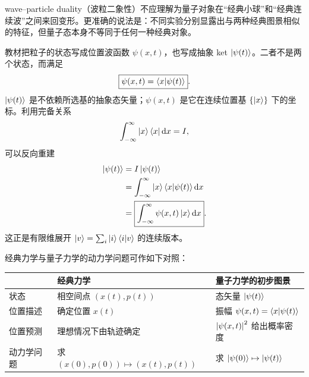 wave--particle duality（波粒二象性）不应理解为量子对象在“经典小球”和“经典连续波”之间来回变形。更准确的说法是：不同实验分别显露出与两种经典图景相似的特征，但量子态本身不等同于任何一种经典对象。



教材把粒子的状态写成位置波函数 $\psi(x,t)$，也写成抽象 ket $\left|\psi(t)\right\rangle$。二者不是两个状态，而满足
\begin{equation}
  \boxed{\psi(x,t)=\left\langle x \middle| \psi(t) \right\rangle}.
  \label{eq:QM-C03-S05-position-component}
\end{equation}
$\left|\psi(t)\right\rangle$ 是不依赖所选基的抽象态矢量；$\psi(x,t)$ 是它在连续位置基 $\{\left|x\right\rangle\}$ 下的坐标。利用完备关系
\begin{equation}
  \int_{-\infty}^{\infty}\left|x\right\rangle\left\langle x\right|\mathop{}\!\mathrm{d} x=I,
  \label{eq:QM-C03-S05-position-completeness}
\end{equation}
可以反向重建
\begin{align}
  \left|\psi(t)\right\rangle
  &=I\left|\psi(t)\right\rangle \notag\\
  &=\int_{-\infty}^{\infty}
    \left|x\right\rangle\left\langle x \middle| \psi(t) \right\rangle\mathop{}\!\mathrm{d} x \notag\\
  &=\boxed{
    \int_{-\infty}^{\infty}
    \psi(x,t)\left|x\right\rangle\mathop{}\!\mathrm{d} x}.
  \label{eq:QM-C03-S05-state-reconstruction}
\end{align}
这正是有限维展开 $\left|v\right\rangle=\sum_i\left|i\right\rangle\left\langle i \middle| v \right\rangle$ 的连续版本。

经典力学与量子力学的动力学问题可作如下对照：
\begin{center}
\begin{tabularx}{0.94\textwidth}{@{}>{\raggedright\arraybackslash}p{2.6cm}XX@{}}
  \toprule
  & 经典力学 & 量子力学的初步图景 \\
  \midrule
  状态 & 相空间点 $(x(t),p(t))$ & 态矢量 $\left|\psi(t)\right\rangle$ \\
  位置描述 & 确定位置 $x(t)$ & 振幅 $\psi(x,t)=\left\langle x \middle| \psi(t) \right\rangle$ \\
  位置预测 & 理想情况下由轨迹确定 & $\left|\psi(x,t)\right|^2$ 给出概率密度 \\
  动力学问题 & 求 $(x(0),p(0))\mapsto(x(t),p(t))$ & 求 $\left|\psi(0)\right\rangle\mapsto\left|\psi(t)\right\rangle$ \\
  \bottomrule
\end{tabularx}
\end{center}


